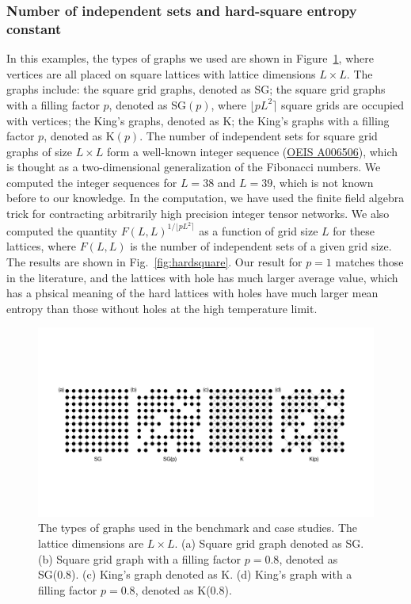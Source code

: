 \documentclass[onefignum, onetabnum]{siamart190516}
\newcommand{\<}{\langle}
\renewcommand{\>}{\rangle}
\newcommand{\Fig}[1]{Fig.~\ref{#1}}
\newcounter{example}
\begin{document}
\subsubsection{Number of independent sets and hard-square entropy constant}
In this examples, the types of graphs we used are shown in Figure~\ref{fig:lattices}, where vertices are all placed on square lattices with lattice dimensions $L \times L$.
The graphs include: the square grid graphs, denoted as SG; the square grid graphs with a filling factor $p$, denoted as SG$(p)$, where $\lfloor pL^{2} \rceil$ square grids are occupied with vertices;
the King's graphs, denoted as K; the King's graphs with a filling factor $p$, denoted as K$(p)$. 
The number of independent sets for square grid graphs of size $L \times L$ form a well-known integer sequence (\href{https://oeis.org/A006506}{OEIS A006506}), which is thought as a two-dimensional generalization of the Fibonacci numbers.
We computed the integer sequences for $L=38$ and $L=39$, which is not known before to our knowledge.
In the computation, we have used the finite field algebra trick for contracting arbitrarily high precision integer tensor networks.
We also computed the quantity $F(L,L)^{1/\lfloor pL^2\rceil}$ as a function of grid size $L$ for these lattices,
where $F(L,L)$ is the number of independent sets of a given grid size.
The results are shown in \Fig{fig:hardsquare}.
Our result for $p=1$ matches those in the literature, and the lattices with hole has much larger average value,
which has a phsical meaning of the hard lattices with holes have much larger mean entropy than those without holes at the high temperature limit.

\begin{figure}[t] 
    \centering
    \includegraphics[width=\textwidth, trim={0cm 0cm 0cm 0cm}, clip]{lattices.pdf}
    \caption{The types of graphs used in the benchmark and case studies.
    The lattice dimensions are $L\times L$. (a) Square grid graph denoted as SG. (b) Square grid graph with a filling factor $p=0.8$, denoted as SG(0.8).
    (c) King's graph denoted as K. (d) King's graph with a filling factor $p=0.8$, denoted as K(0.8).}
    \label{fig:lattices}
\end{figure}
\end{document}
